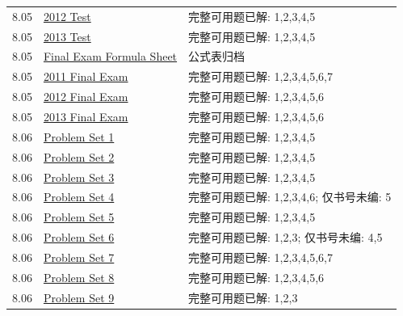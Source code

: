 \begin{longtable}{p{}p{}p{}}
8.05 & \href{https://ocw.mit.edu/courses/8-05-quantum-physics-ii-fall-2013/resources/test-2012/}{2012 Test} & 完整可用题已解: 1,2,3,4,5\\
8.05 & \href{https://ocw.mit.edu/courses/8-05-quantum-physics-ii-fall-2013/resources/test-2013/}{2013 Test} & 完整可用题已解: 1,2,3,4,5\\
8.05 & \href{https://ocw.mit.edu/courses/8-05-quantum-physics-ii-fall-2013/resources/final-exam-formula-sheet/}{Final Exam Formula Sheet} & 公式表归档\\
8.05 & \href{https://ocw.mit.edu/courses/8-05-quantum-physics-ii-fall-2013/resources/exam-2011/}{2011 Final Exam} & 完整可用题已解: 1,2,3,4,5,6,7\\
8.05 & \href{https://ocw.mit.edu/courses/8-05-quantum-physics-ii-fall-2013/resources/exam-2012/}{2012 Final Exam} & 完整可用题已解: 1,2,3,4,5,6\\
8.05 & \href{https://ocw.mit.edu/courses/8-05-quantum-physics-ii-fall-2013/resources/exam-2013/}{2013 Final Exam} & 完整可用题已解: 1,2,3,4,5,6\\
8.06 & \href{https://ocw.mit.edu/courses/8-06-quantum-physics-iii-spring-2018/resources/problem-set-1/}{Problem Set 1} & 完整可用题已解: 1,2,3,4,5\\
8.06 & \href{https://ocw.mit.edu/courses/8-06-quantum-physics-iii-spring-2018/resources/problem-set-2/}{Problem Set 2} & 完整可用题已解: 1,2,3,4,5\\
8.06 & \href{https://ocw.mit.edu/courses/8-06-quantum-physics-iii-spring-2018/resources/problem-set-3/}{Problem Set 3} & 完整可用题已解: 1,2,3,4,5\\
8.06 & \href{https://ocw.mit.edu/courses/8-06-quantum-physics-iii-spring-2018/resources/problem-set-4/}{Problem Set 4} & 完整可用题已解: 1,2,3,4,6; 仅书号未编: 5\\
8.06 & \href{https://ocw.mit.edu/courses/8-06-quantum-physics-iii-spring-2018/resources/problem-set-5/}{Problem Set 5} & 完整可用题已解: 1,2,3,4,5\\
8.06 & \href{https://ocw.mit.edu/courses/8-06-quantum-physics-iii-spring-2018/resources/problem-set-6/}{Problem Set 6} & 完整可用题已解: 1,2,3; 仅书号未编: 4,5\\
8.06 & \href{https://ocw.mit.edu/courses/8-06-quantum-physics-iii-spring-2018/resources/problem-set-7/}{Problem Set 7} & 完整可用题已解: 1,2,3,4,5,6,7\\
8.06 & \href{https://ocw.mit.edu/courses/8-06-quantum-physics-iii-spring-2018/resources/problem-set-8/}{Problem Set 8} & 完整可用题已解: 1,2,3,4,5,6\\
8.06 & \href{https://ocw.mit.edu/courses/8-06-quantum-physics-iii-spring-2018/resources/problem-set-9/}{Problem Set 9} & 完整可用题已解: 1,2,3\\
\bottomrule\end{longtable}
